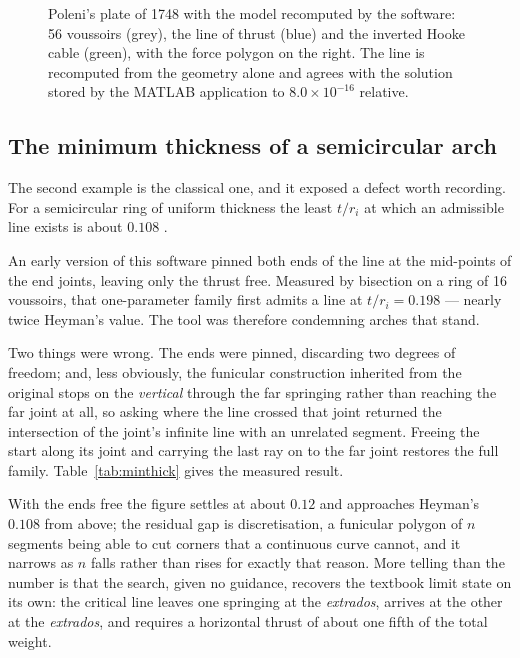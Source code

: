 \documentclass[final,3p,times,twocolumn]{elsarticle}
\begin{document}
\begin{figure}[t]
\centering

\caption{Poleni's plate of 1748 with the model recomputed by the software:
  56 voussoirs (grey), the line of thrust (blue) and the inverted Hooke cable
  (green), with the force polygon on the right. The line is recomputed from
  the geometry alone and agrees with the solution stored by the MATLAB
  application to $8.0\times10^{-16}$ relative.}
\label{fig:poleni}
\end{figure}

\subsection{The minimum thickness of a semicircular arch}

The second example is the classical one, and it exposed a defect worth
recording. For a semicircular ring of uniform thickness the least $t/r_i$ at
which an admissible line exists is about $0.108$ \cite{Heyman1982,Huerta2006}.

An early version of this software pinned both ends of the line at the
mid-points of the end joints, leaving only the thrust free. Measured by
bisection on a ring of 16 voussoirs, that one-parameter family first admits a
line at $t/r_i = 0.198$ --- nearly twice Heyman's value. The tool was
therefore condemning arches that stand.

Two things were wrong. The ends were pinned, discarding two degrees of freedom;
and, less obviously, the funicular construction inherited from the original
stops on the \emph{vertical} through the far springing rather than reaching the
far joint at all, so asking where the line crossed that joint returned the
intersection of the joint's infinite line with an unrelated segment. Freeing
the start along its joint and carrying the last ray on to the far joint
restores the full family. Table~\ref{tab:minthick} gives the measured result.

\begin{table}[t]
\footnotesize
\centering
\caption{Least $t/r_i$ admitting a line of thrust on a semicircular ring, by
  bisection, against the number of voussoirs $n$. Heyman's value for a
  continuous ring is $0.108$.}
\label{tab:minthick}


\end{table}

With the ends free the figure settles at about $0.12$ and approaches Heyman's
$0.108$ from above; the residual gap is discretisation, a funicular polygon of
$n$ segments being able to cut corners that a continuous curve cannot, and it
narrows as $n$ falls rather than rises for exactly that reason. More telling
than the number is that the search, given no guidance, recovers the textbook
limit state on its own: the critical line leaves one springing at the
\emph{extrados}, arrives at the other at the \emph{extrados}, and requires a
horizontal thrust of about one fifth of the total weight.
\end{document}
